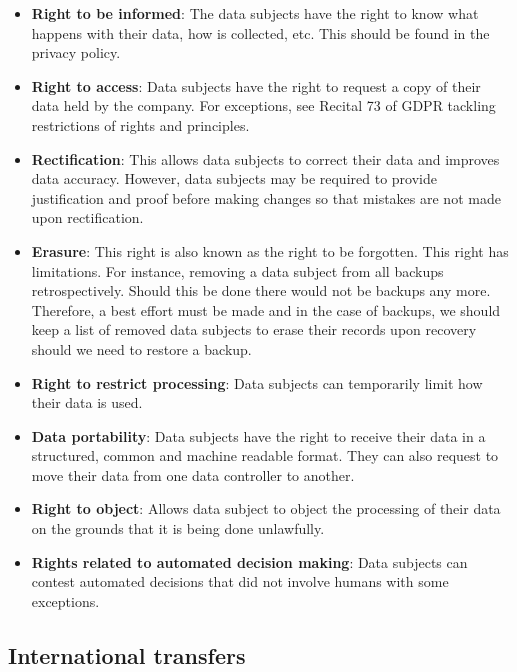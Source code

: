 \documentclass[
  12pt,
]{book}
\providecommand{\tightlist}{%
  \setlength{\itemsep}{0pt}\setlength{\parskip}{0pt}}
\begin{document}
\begin{itemize}
\tightlist
\item
  \textbf{Right to be informed}: The data subjects have the right to know what happens with their data, how is collected, etc. This should be found in the privacy policy.
\item
  \textbf{Right to access}: Data subjects have the right to request a copy of their data held by the company. For exceptions, see Recital 73 of GDPR tackling restrictions of rights and principles.
\item
  \textbf{Rectification}: This allows data subjects to correct their data and improves data accuracy. However, data subjects may be required to provide justification and proof before making changes so that mistakes are not made upon rectification.
\item
  \textbf{Erasure}: This right is also known as the right to be forgotten. This right has limitations. For instance, removing a data subject from all backups retrospectively. Should this be done there would not be backups any more. Therefore, a best effort must be made and in the case of backups, we should keep a list of removed data subjects to erase their records upon recovery should we need to restore a backup.
\item
  \textbf{Right to restrict processing}: Data subjects can temporarily limit how their data is used.
\item
  \textbf{Data portability}: Data subjects have the right to receive their data in a structured, common and machine readable format. They can also request to move their data from one data controller to another.
\item
  \textbf{Right to object}: Allows data subject to object the processing of their data on the grounds that it is being done unlawfully.
\item
  \textbf{Rights related to automated decision making}: Data subjects can contest automated decisions that did not involve humans with some exceptions.
\end{itemize}

\subsection{International transfers}\label{international-transfers}
\end{document}
